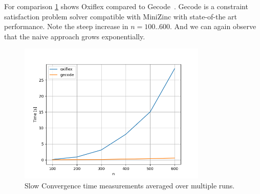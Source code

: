 For comparison \cref{fig:slow:gecode} shows Oxiflex compared to Gecode~\cite{gecode}. Gecode is a constraint satisfaction problem solver compatible with MiniZinc with state-of-the art performance. Note the steep increase in $n = 100..600$. And we can again observe that the naive approach grows exponentially.

\begin{figure}[ht]
	\centering
	\includegraphics[width=0.8\textwidth]{./Problems/slow_convergence/plots/gecode.png}
	\caption{Slow Convergence time measurements averaged over multiple runs.}
	\label{fig:slow:gecode}
\end{figure}

